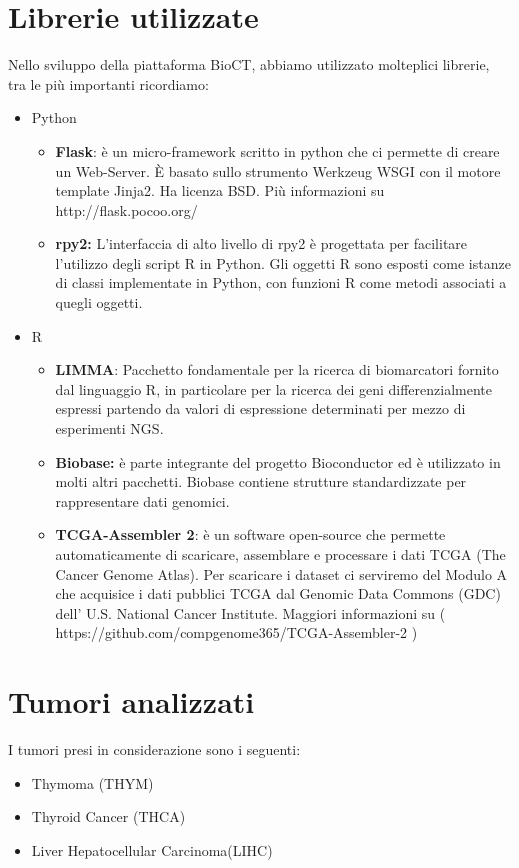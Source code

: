 \documentclass[10pt,a4paper]{report}
\begin{document}
\section{Librerie utilizzate}
Nello sviluppo della piattaforma BioCT, abbiamo utilizzato molteplici librerie, tra le più importanti ricordiamo:
\begin{itemize}
\item Python
\begin{itemize}
\item \textbf{Flask}: è un micro-framework scritto in python che ci permette di creare un Web-Server. È basato sullo strumento Werkzeug WSGI con il motore template Jinja2. Ha licenza BSD. Più informazioni su http://flask.pocoo.org/
\item \textbf{rpy2:} L'interfaccia di alto livello di rpy2 è progettata per facilitare l'utilizzo degli script R in Python. Gli oggetti R sono esposti come istanze di classi implementate in Python, con funzioni R come metodi associati a quegli oggetti.
\end{itemize}
\end{itemize}
\begin{itemize}
\item R
\begin{itemize}
\item \textbf{LIMMA}: Pacchetto fondamentale per la ricerca di biomarcatori fornito dal linguaggio R, in particolare per la ricerca dei geni differenzialmente espressi partendo da valori di espressione determinati per mezzo di esperimenti NGS.
\item \textbf{Biobase:} è parte integrante del progetto Bioconductor ed è utilizzato in molti altri pacchetti. Biobase contiene strutture standardizzate per rappresentare dati genomici.

\item \textbf{TCGA-Assembler 2}: è un software open-source che permette automaticamente di scaricare, assemblare e processare i dati \newline TCGA (The Cancer Genome Atlas). Per scaricare i dataset ci serviremo del Modulo A che acquisice i dati pubblici TCGA dal Genomic Data Commons (GDC) dell’ U.S. National Cancer Institute. Maggiori informazioni su ( https://github.com/compgenome365/TCGA-Assembler-2 )

\end{itemize}

\end{itemize}

\section{Tumori analizzati}
I tumori presi in considerazione sono i seguenti:
\begin{itemize}
\item Thymoma (THYM)
\item Thyroid Cancer (THCA)
\item Liver Hepatocellular Carcinoma(LIHC)
\end{itemize}
\end{document}
